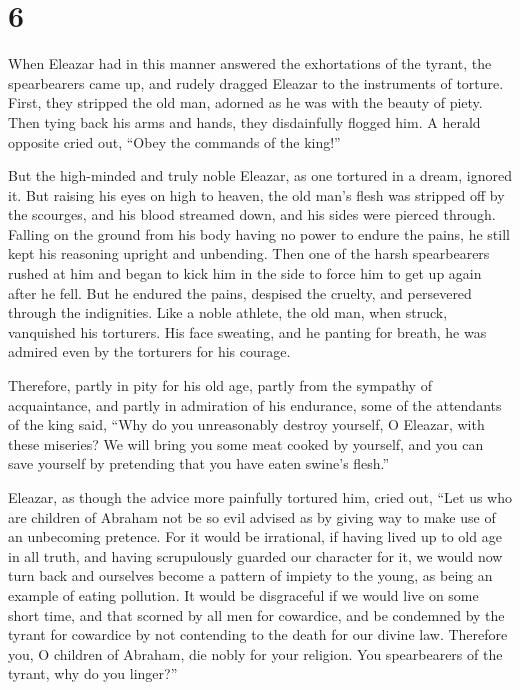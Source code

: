 \hypertarget{section-5}{%
\section{6}\label{section-5}}

 When Eleazar had in this manner answered the exhortations
of the tyrant, the spearbearers came up, and rudely dragged Eleazar to
the instruments of torture.  First, they stripped the old
man, adorned as he was with the beauty of piety.  Then tying
back his arms and hands, they disdainfully flogged him.  A
herald opposite cried out, ``Obey the commands of the king!''

 But the high-minded and truly noble Eleazar, as one
tortured in a dream, ignored it.  But raising his eyes on
high to heaven, the old man's flesh was stripped off by the scourges,
and his blood streamed down, and his sides were pierced through.
 Falling on the ground from his body having no power to
endure the pains, he still kept his reasoning upright and unbending.
 Then one of the harsh spearbearers rushed at him and began
to kick him in the side to force him to get up again after he fell.
 But he endured the pains, despised the cruelty, and
persevered through the indignities.  Like a noble athlete,
the old man, when struck, vanquished his torturers.  His
face sweating, and he panting for breath, he was admired even by the
torturers for his courage.

 Therefore, partly in pity for his old age, 
partly from the sympathy of acquaintance, and partly in admiration of
his endurance, some of the attendants of the king said, 
``Why do you unreasonably destroy yourself, O Eleazar, with these
miseries?  We will bring you some meat cooked by yourself,
and you can save yourself by pretending that you have eaten swine's
flesh.''

 Eleazar, as though the advice more painfully tortured him,
cried out,  ``Let us who are children of Abraham not be so
evil advised as by giving way to make use of an unbecoming pretence.
 For it would be irrational, if having lived up to old age
in all truth, and having scrupulously guarded our character for it, we
would now turn back  and ourselves become a pattern of
impiety to the young, as being an example of eating pollution.
 It would be disgraceful if we would live on some short
time, and that scorned by all men for cowardice,  and be
condemned by the tyrant for cowardice by not contending to the death for
our divine law.  Therefore you, O children of Abraham, die
nobly for your religion.  You spearbearers of the tyrant,
why do you linger?''

